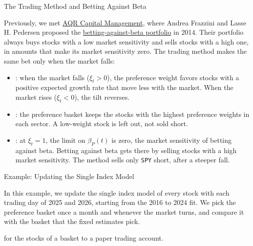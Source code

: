 \begin{frame}{The Trading Method and Betting Against Beta}
  \vspace{0.05em}
  {\large\textbf{}}

  \vspace{0.2em}
  Previously, we met \href{https://www.aqr.com/Our-Firm/About-Us}{AQR Capital Management}, where Andrea
  Frazzini and Lasse H. Pedersen proposed the
  \href{https://www.aqr.com/Insights/Research/Journal-Article/Betting-Against-Beta}{betting-against-beta portfolio}
  in 2014. Their portfolio always buys stocks with a low market sensitivity and sells stocks with
  a high one, in amounts that make its market sensitivity zero. The trading method makes the same
  bet only when the market falls:

  \vspace{0.05em}
  \begin{itemize}\setlength{\itemsep}{0.15em}
    \item {}: when the market falls ($\xi_{t}>0$), the preference weight favors stocks
      with a positive expected growth rate that move less with the market. When the market rises ($\xi_{t}<0$), the tilt reverses.
    \item {}: the preference basket keeps the stocks with the highest
      preference weights in each sector. A low-weight stock is left out, not sold short.
    \item {}: at $\xi_{t}=1$, the limit on $\beta_{P}(t)$ is zero, the market
      sensitivity of betting against beta. Betting against beta gets there by selling stocks with a
      high market sensitivity. The method sells only \texttt{SPY} short, after a steeper fall.
  \end{itemize}
\end{frame}

\begin{frame}{Example: Updating the Single Index Model}
  \vspace{0.3em}
  {\normalsize\textbf{}\par\small
  \href{\repo/CHEME-5660-L15a-Example-Updating-SIM-Gamma-Fall-2026.ipynb}{}}

  \vspace{0.8em}
  In this example, we update the single index model of every stock with each trading day of 2025
  and 2026, starting from the 2016 to 2024 fit. We pick the preference basket once a month and
  whenever the market turns, and compare it with the basket that the fixed estimates pick.

  \vspace{0.8em}
  for the stocks of a basket to a paper trading account.
\end{frame}

